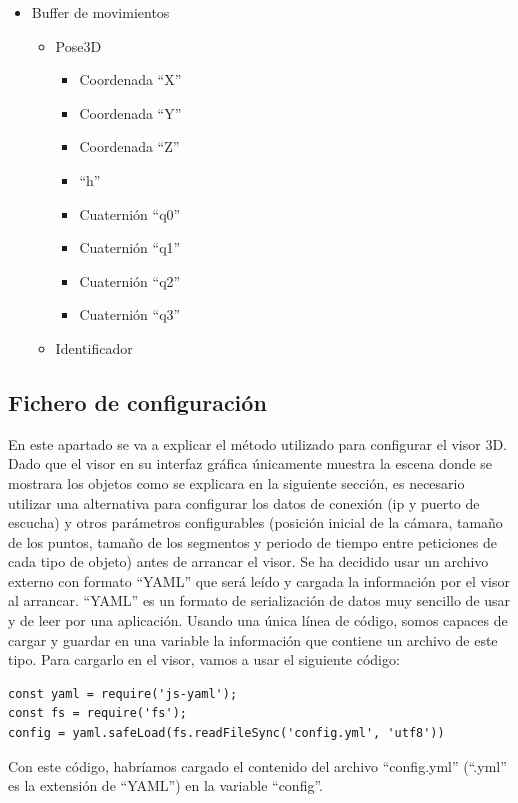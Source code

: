 \begin{itemize}
	\item Buffer de movimientos
	\begin{itemize}
		\item	Pose3D
		\begin{itemize}
			\item Coordenada ``X''
			\item Coordenada ``Y''
			\item Coordenada ``Z''
			\item ``h''
			\item Cuaternión ``q0''
			\item Cuaternión ``q1''
			\item Cuaternión ``q2''
			\item Cuaternión ``q3''
		\end{itemize}
		\item Identificador
	\end{itemize}
\end{itemize}

\subsection{Fichero de configuración}
En este apartado se va a explicar el método utilizado para configurar el visor 3D. Dado que el visor en su interfaz gráfica únicamente muestra la escena donde se mostrara los objetos como se explicara en la siguiente sección, es necesario utilizar una alternativa para configurar los datos de conexión (ip y puerto de escucha) y otros parámetros configurables (posición inicial de la cámara, tamaño de los puntos, tamaño de los segmentos y periodo de tiempo entre peticiones de cada tipo de objeto) antes de arrancar el visor.
Se ha decidido usar un archivo externo con formato ``YAML'' que será leído y cargada la información por el visor al arrancar. ``YAML'' es un formato de serialización de datos muy sencillo de usar y de leer por una aplicación. Usando una única línea de código, somos capaces de cargar y guardar en una variable la información que contiene un archivo de este tipo. Para cargarlo en el visor, vamos a usar el siguiente código:
\begin{lstlisting}[frame=single]
const yaml = require('js-yaml');
const fs = require('fs');
config = yaml.safeLoad(fs.readFileSync('config.yml', 'utf8'))
\end{lstlisting}
Con este código, habríamos cargado el contenido del archivo ``config.yml'' (``.yml'' es la extensión de ``YAML'') en la variable ``config''.

